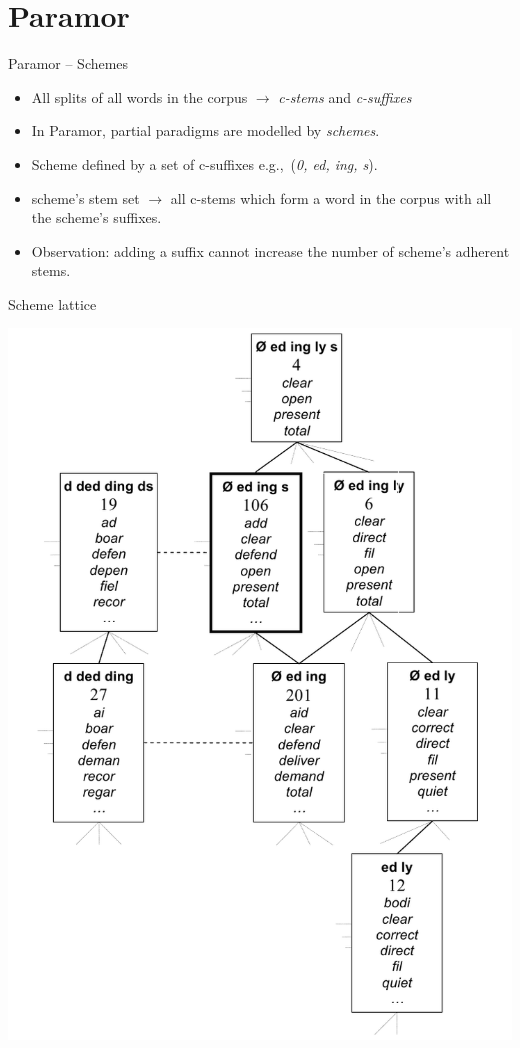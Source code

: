 \documentclass[hyperref={pdfencoding=unicode, unicode=true}, xcolor=dvipsnames]{beamer}
\newcommand{\eg}{e.g.,~}
\begin{document}
\section{Paramor}

\begin{frame}{Paramor -- Schemes}
\begin{itemize}
\item All splits of all words in the corpus $\rightarrow$ \emph{c-stems} and \emph{c-suffixes}
\item In Paramor, partial paradigms are modelled by \emph{schemes}.
\item Scheme defined by a set of c-suffixes \eg (\emph{0, ed, ing, s}).
\item scheme's stem set $\rightarrow$ all c-stems which form a word in the corpus with all the scheme's suffixes.
\item Observation: adding a suffix cannot increase the number of scheme's adherent stems.
\end{itemize}
\end{frame}

\begin{frame}{Scheme lattice}
\vspace{-8pt}
\begin{center}
\includegraphics[scale=0.25]{schemeLattice.png}
\end{center}

\end{frame}
\end{document}
